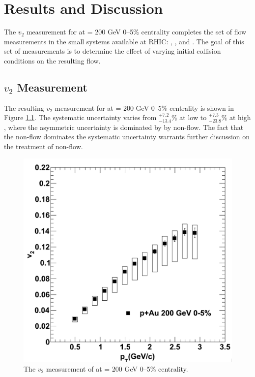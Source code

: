 \chapter{Results and Discussion}
The $v_2$ measurement for \pau at \sqsn = 200 GeV 0--5\% centrality completes the set of flow measurements in the small systems available at RHIC: \pau, \dau, and \hau. The goal of this set of measurements is to determine the effect of varying initial collision conditions on the resulting flow.
\section{$v_2$ Measurement}
The resulting $v_2$ measurement for \pau at \sqsn = 200 GeV 0--5\% centrality is shown in Figure \ref{fig:pau_points_alone}. The systematic uncertainty varies from $^{+7.2}_{-13.4}\%$ at low \pt to $^{+7.3}_{-23.8}\%$ at high \pt, where the asymmetric uncertainty is dominated by by non-flow. The fact that the non-flow dominates the systematic uncertainty warrants further discussion on the treatment of non-flow.

\begin{figure}[!ht]
\begin{center}
\includegraphics[width=0.65\linewidth]{figs/pau_points.png}
\caption{The $v_2$ measurement of \pau at \sqsn =  200 GeV 0--5\% centrality.}
\label{fig:pau_points_alone}
\end{center}
\end{figure}

